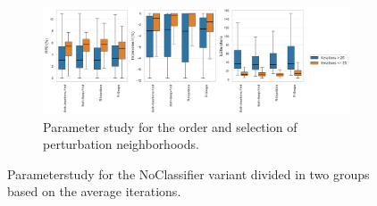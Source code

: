 \begin{figure}[!ht]
\begin{subfigure}[t]{0.83\textwidth}
	\end{subfigure}
	\begin{subfigure}[t]{0.83\textwidth}
		\centering
		\caption{Parameter study for the order and selection of perturbation neighborhoods.}
		\includegraphics[width=\textwidth]{pictures/parameter_study/PerturbationTypes_base_parameter_study.png}
	\end{subfigure}
	\caption{Parameterstudy for the NoClassifier variant divided in two groups based on the average iterations.}
\end{figure}

\FloatBarrier
